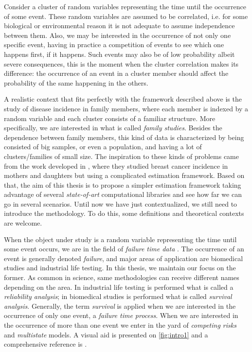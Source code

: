 Consider a cluster of random variables representing the time until the
occurrence of some event. These random variables are assumed to be
correlated, i.e. for some biological or environmental reason it is not
adequate to assume independence between them. Also, we may be interested
in the occurrence of not only one specific event, having in practice a
competition of events to see which one happens first, if it
happens. Such events may also be of low probability albeit severe
consequences, this is the moment when the cluster correlation makes its
difference: the occurrence of an event in a cluster member should affect
the probability of the same happening in the others.

A realistic context that fits perfectly with the framework described
above is the study of disease incidence in family members, where each
member is indexed by a random variable and each cluster consists of a
familiar structure. More specifically, we are interested in what is
called \textit{family studies}. Besides the dependence between family
members, this kind of data is characterized by being consisted of big
samples, or even a population, and having a lot of clusters/families of
small size. The inspiration to these kinds of problems came from the
work developed in , where they studied breast cancer
incidence in mothers and daughters but using a complicated estimation
framework. Based on that, the aim of this thesis is to propose a simpler
estimation framework taking advantage of several \textit{state-of-art}
computational libraries and see how far we can go in several
scenarios. Until now we have just contextualized, we still need to
introduce the methodology. To do this, some definitions and theoretical
contexts are welcome.

When the object under study is a random variable representing the time
until some event occurs, we are in the field of \textit{failure time
data} \cite{kalb&prentice}. The occurrence of an event is generally
denoted \textit{failure}, and major areas of application are biomedical
studies and industrial life testing. In this thesis, we maintain our
focus on the former. As common in science, same methodologies can
receive different names depending on the area. In industrial life
testing is performed what is called a \textit{reliability analysis}; in
biomedical studies is performed what is called
\textit{survival analysis}. Generally, the term \textit{survival} is
applied when we are interested in the occurrence of only one event, a
\textit{failure time process}. When we are interested in the occurrence
of more than one event we enter in the yard of \textit{competing risks}
and \textit{multistate} models. A visual aid is presented on
\autoref{fig:intro1} and a comprehensive reference is
.


